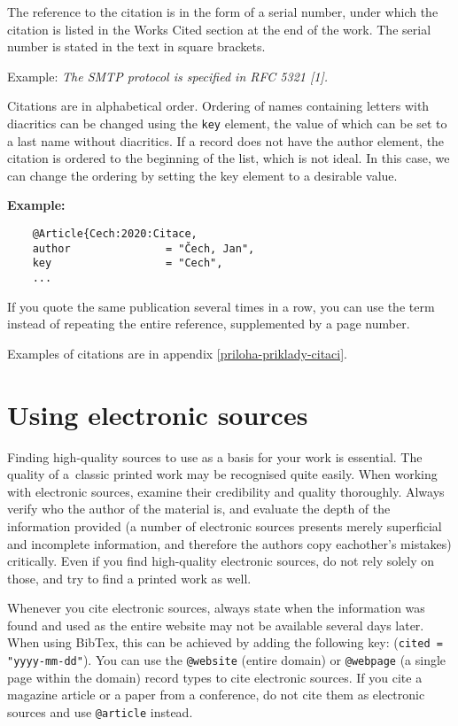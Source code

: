 The reference to the citation is in the form of a serial number, under which the citation is listed in the Works Cited section at the end of the work. The serial number is stated in the text in square brackets.

\noindent Example: \textit{The SMTP protocol is specified in RFC 5321 [1].}

Citations are in alphabetical order. Ordering of names containing letters with diacritics can be changed using the \texttt{key} element, the value of which can be set to a last name without diacritics. If a record does not have the author element, the citation is ordered to the beginning of the list, which is not ideal. In this case, we can change the ordering by setting the key element to a desirable value.

\textbf{Example:}
\begin{verbatim}
    @Article{Cech:2020:Citace,
    author               = "Čech, Jan",
    key                  = "Cech",
    ...
\end{verbatim}

If you quote the same publication several times in a row, you can use the 
term  instead of repeating the entire reference, supplemented 
by a page number.

Examples of citations are in appendix \ref{priloha-priklady-citaci}.

\section{Using electronic sources}

Finding high-quality sources to use as a basis for your work is essential. The quality of a~classic printed work may be recognised quite easily. When working with electronic sources, examine their credibility and quality thoroughly. Always verify who the author of the material is, and evaluate the depth of the information provided (a number of electronic sources presents merely superficial and incomplete information, and therefore the authors copy eachother's mistakes) critically.
Even if you find high-quality electronic sources, do not rely solely on those, and try to find a printed work as well.

Whenever you cite electronic sources, always state when the information was found and used as the entire website may not be available several days later. When using BibTex, this can be achieved by adding the following key: (\verb|cited = "yyyy-mm-dd"|). You can use the \verb|@website| (entire domain) or \verb|@webpage| (a single page within the domain) record types to cite electronic sources. If you cite a magazine article or a paper from a conference, do not cite them as electronic sources and use \verb|@article| instead.

